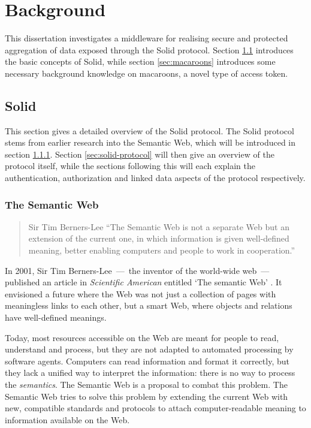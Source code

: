 \chapter{Background}
\label{cha:background}
This dissertation investigates a middleware for realising secure and protected aggregation of data exposed through the Solid protocol. Section \ref{sec:solid} introduces the basic concepts of Solid, while section \ref{sec:macaroons} introduces some necessary background knowledge on macaroons, a novel type of access token.

\section{Solid}
\label{sec:solid}
This section gives a detailed overview of the Solid protocol. The Solid protocol stems from earlier research into the Semantic Web, which will be introduced in section \ref{sec:semantic-web}. Section \ref{sec:solid-protocol} will then give an overview of the protocol itself, while the sections following this will each explain the authentication, authorization and linked data aspects of the protocol respectively.

\subsection{The Semantic Web}
\label{sec:semantic-web}
\begin{quote}{Sir Tim Berners-Lee}
    ``The Semantic Web is not a separate Web but an extension of the current one, in which information is given well-defined meaning, better enabling computers and people to work in cooperation.''
\end{quote}

\noindent In 2001, Sir Tim Berners-Lee \,---\, the inventor of the world-wide web \,---\, published an article in \textit{Scientific American} entitled `The semantic Web' \citep{semantic-web}. It envisioned a future where the Web was not just a collection of pages with meaningless links to each other, but a smart Web, where objects and relations have well-defined meanings.

Today, most resources accessible on the Web are meant for people to read, understand and process, but they are not adapted to automated processing by software agents. Computers can read information and format it correctly, but they lack a unified way to interpret the information: there is no way to process the \textit{semantics}. The Semantic Web is a proposal to combat this problem. The Semantic Web tries to solve this problem by extending the current Web with new, compatible standards and protocols to attach computer-readable meaning to information available on the Web.

